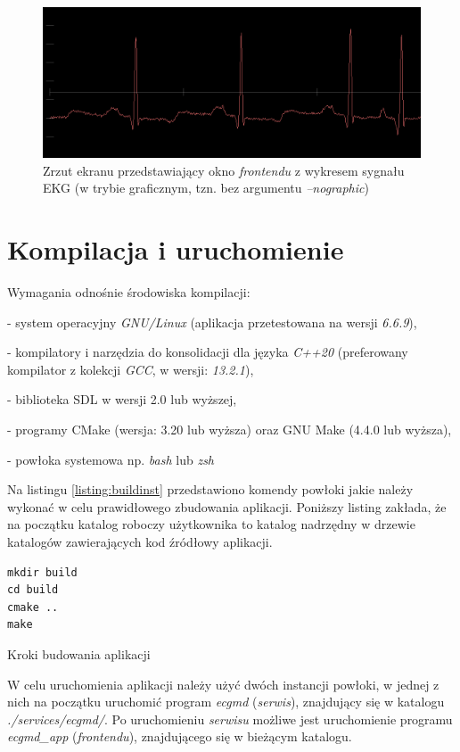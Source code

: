 \begin{figure}[h!]
    \centering 
    \includegraphics[scale=0.6]{pl/media/frontend_window.png}
    \caption{Zrzut ekranu przedstawiający okno \textit{frontendu} z wykresem sygnału EKG 
    (w trybie graficznym, tzn. bez argumentu \textit{--nographic})}
    \label{fig:frontendwin}
\end{figure}

\newpage

\section{Kompilacja i uruchomienie}

Wymagania odnośnie środowiska kompilacji:

- system operacyjny \textit{GNU/Linux} (aplikacja przetestowana na wersji \textit{6.6.9}),

- kompilatory i narzędzia do konsolidacji dla języka \textit{C++20}
  (preferowany kompilator z kolekcji \textit{GCC}, w wersji: \textit{13.2.1}),

- biblioteka SDL w wersji 2.0 lub wyższej,

- programy CMake (wersja: 3.20 lub wyższa) oraz GNU Make (4.4.0 lub wyższa),

- powłoka systemowa np. \textit{bash} lub \textit{zsh}

Na listingu \ref{listing:buildinst} przedstawiono komendy powłoki jakie należy wykonać w celu prawidłowego
zbudowania aplikacji. Poniższy listing zakłada, że na początku katalog roboczy użytkownika to katalog 
nadrzędny w drzewie katalogów zawierających kod źródłowy aplikacji.

\begin{listing}
\begin{verbatim}
mkdir build
cd build
cmake ..
make
\end{verbatim}
    \caption{Kroki budowania aplikacji}
\label{listing:buildinst}
\end{listing}

W celu uruchomienia aplikacji należy użyć dwóch instancji powłoki, w jednej z nich na początku uruchomić program
\textit{ecgmd} (\textit{serwis}), znajdujący się w katalogu \textit{./services/ecgmd/}.
Po uruchomieniu \textit{serwisu} możliwe jest uruchomienie programu \textit{ecgmd\_app} (\textit{frontendu}), znajdującego
się w bieżącym katalogu.


